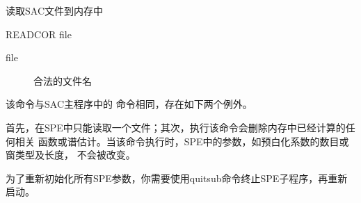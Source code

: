 \label{spe:readcor}

读取SAC文件到内存中

\begin{SACSTX}
READCOR file
\end{SACSTX}

\begin{description}
\item [file] 合法的文件名
\end{description}

该命令与SAC主程序中的  命令相同，存在如下两个例外。

首先，在SPE中只能读取一个文件；其次，执行该命令会删除内存中已经计算的任何相关
函数或谱估计。当该命令执行时，SPE中的参数，如预白化系数的数目或窗类型及长度，
不会被改变。

为了重新初始化所有SPE参数，你需要使用quitsub命令终止SPE子程序，再重新启动。
